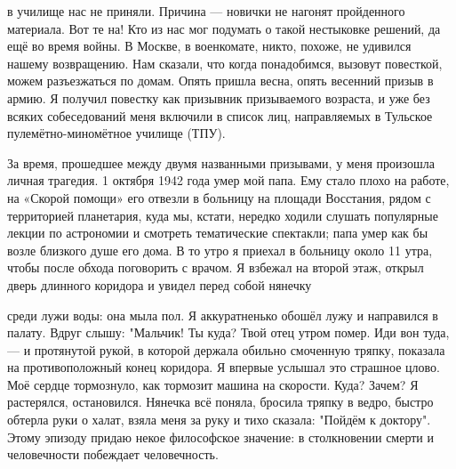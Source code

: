 \label{251-1}
в училище нас не приняли. Причина — новички не нагонят пройденного материала. Вот те на! Кто из нас мог подумать о такой нестыковке решений, да ещё во время войны. В Москве, в военкомате, никто, похоже, не удивился нашему возвращению. Нам сказали, что когда понадобимся, вызовут повесткой, можем разъезжаться по домам. Опять пришла весна, опять весенний призыв в армию. Я получил повестку как призывник призываемого возраста, и уже без всяких собеседований меня включили в список лиц, направляемых в Тульское пулемётно-миномётное училище (ТПУ).

\label{252-1}
За время, прошедшее между двумя названными призывами, у меня произошла личная трагедия. 1 октября 1942 года умер мой папа. Ему стало плохо на работе, на «Скорой помощи» его отвезли в больницу на площади Восстания, рядом с территорией планетария, куда мы, кстати, нередко ходили слушать популярные лекции по астрономии и смотреть тематические спектакли; папа умер как бы возле близкого душе его дома. В то утро я приехал в больницу около 11 утра, чтобы после обхода поговорить с врачом. Я взбежал на второй этаж, открыл дверь длинного коридора и увидел перед собой нянечку

\label{253-1}
среди лужи воды: она мыла пол. Я аккуратненько обошёл лужу и направился в палату. Вдруг слышу: "Мальчик! Ты куда? Твой отец утром помер. Иди вон туда, — и протянутой рукой, в которой держала обильно смоченную тряпку, показала на противоположный конец коридора. Я впервые услышал это страшное цлово. Моё сердце тормознуло, как тормозит машина на скорости. Куда? Зачем? Я растерялся, остановился. Нянечка всё поняла, бросила тряпку в ведро, быстро обтерла руки о халат, взяла меня за руку и тихо сказала: "Пойдём к доктору". Этому эпизоду придаю некое философское значение: в столкновении смерти и человечности побеждает человечность.